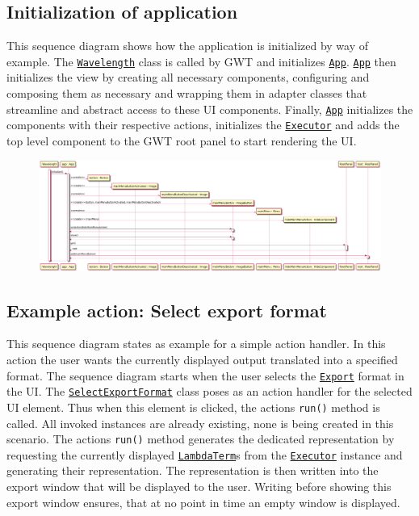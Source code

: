 \subsection{Initialization of application}
This sequence diagram shows how the application is initialized by way of example. The \texttt{\hyperref[type:edu.kit.wavelength.client.client.Wavelength]{Wavelength}} class is called by GWT and initializes \texttt{\hyperref[type:edu.kit.wavelength.client.view.App]{App}}. 
\texttt{\hyperref[type:edu.kit.wavelength.client.view.App]{App}} then initializes the view by creating all necessary components, configuring and composing them as necessary and wrapping them in adapter classes that streamline and abstract access to these UI components.
Finally, \texttt{\hyperref[type:edu.kit.wavelength.client.view.App]{App}} initializes the components with their respective actions, initializes the \texttt{\hyperref[type:edu.kit.wavelength.client.view.execution.Executor]{Executor}} and adds the top level component to the GWT root panel to start rendering the UI.

\begin{figure}[H]
	\centering
	\includegraphics[width=\textwidth]{sequenceDiagrams/initialization}
\end{figure}

\subsection{Example action: Select export format}
This sequence diagram states as example for a simple action handler.
In this action the user wants the currently displayed output translated into a specified format. The sequence diagram starts when the user selects the \texttt{\hyperref[type:edu.kit.wavelength.client.view.export.Export]{Export}} format in the UI. 
The \texttt{\hyperref[type:edu.kit.wavelength.client.view.action.SelectExportFormat]{SelectExportFormat}} class poses as an action handler for the selected UI element. Thus when this element is clicked, the actions \texttt{run()} method is called. All invoked instances are already existing, none is being created in this scenario.
The actions \texttt{run()} method generates the dedicated representation by requesting the currently displayed \texttt{\hyperref[type:edu.kit.wavelength.client.model.term.LambdaTerm]{LambdaTerm}}s from the \texttt{\hyperref[type:edu.kit.wavelength.client.view.execution.Executor]{Executor}} instance and generating their representation.
The representation is then written into the export window that will be displayed to the user. Writing before showing this export window ensures, that at no point in time an empty window is displayed.

